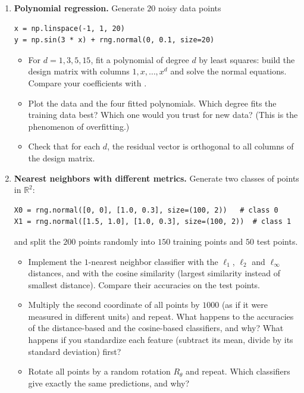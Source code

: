 \begin{enumerate}[label=\textbf{P\arabic*.}, leftmargin=*]
    \item \textbf{Polynomial regression.} Generate $20$ noisy data points
\begin{lstlisting}
x = np.linspace(-1, 1, 20)
y = np.sin(3 * x) + rng.normal(0, 0.1, size=20)
\end{lstlisting}
    \begin{itemize}
        \item For $d = 1, 3, 5, 15$, fit a polynomial of degree $d$ by least squares: build the design matrix with columns $1, x, \ldots, x^d$ and solve the normal equations. Compare your coefficients with .
        \item Plot the data and the four fitted polynomials. Which degree fits the training data best? Which one would you trust for new data? (This is the phenomenon of overfitting.)
        \item Check that for each $d$, the residual vector is orthogonal to all columns of the design matrix.
    \end{itemize}

    \item \textbf{Nearest neighbors with different metrics.} Generate two classes of points in $\mathbb{R}^2$:
\begin{lstlisting}
X0 = rng.normal([0, 0], [1.0, 0.3], size=(100, 2))   # class 0
X1 = rng.normal([1.5, 1.0], [1.0, 0.3], size=(100, 2))  # class 1
\end{lstlisting}
    and split the $200$ points randomly into $150$ training points and $50$ test points.
    \begin{itemize}
        \item Implement the $1$-nearest neighbor classifier with the $\ell_1$, $\ell_2$ and $\ell_\infty$ distances, and with the cosine similarity (largest similarity instead of smallest distance). Compare their accuracies on the test points.
        \item Multiply the second coordinate of all points by $1000$ (as if it were measured in different units) and repeat. What happens to the accuracies of the distance-based and the cosine-based classifiers, and why? What happens if you standardize each feature (subtract its mean, divide by its standard deviation) first?
        \item Rotate all points by a random rotation $R_\theta$ and repeat. Which classifiers give exactly the same predictions, and why?
    \end{itemize}


\end{enumerate}
